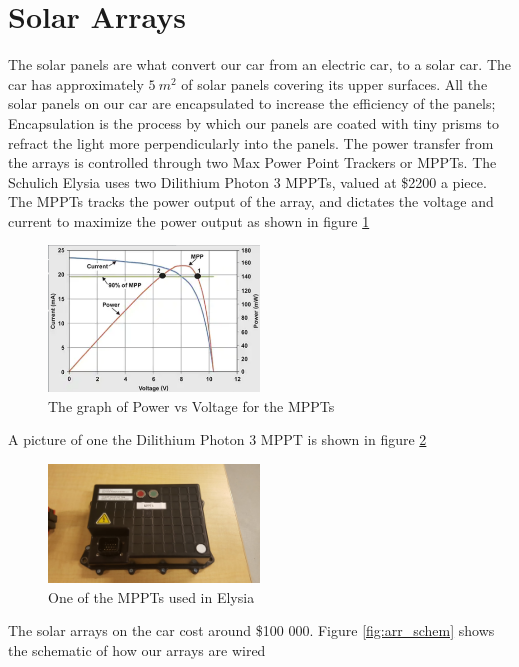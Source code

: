 \documentclass[titlepage]{article}
\begin{document}
    \section{Solar Arrays}
    The solar panels are what convert our car from an electric car, to a
    solar car. The car has approximately $5\ m^2$ of solar panels
    covering its upper surfaces. All the solar panels on our car are
    encapsulated to increase the efficiency of the panels; Encapsulation
    is the process by which our panels are coated with tiny prisms to
    refract the light more perpendicularly into the panels. The power
    transfer from the arrays is controlled through two Max Power Point
    Trackers or MPPTs. The Schulich Elysia uses two Dilithium Photon 3
    MPPTs, valued at \$2200 a piece. The MPPTs tracks the power output
    of the array, and dictates the voltage and current to maximize the
    power output as shown in figure \ref{fig:mppt-graph}
    \begin{figure}[H]
        \centering
        \includegraphics[width=0.5\textwidth]{images/MPPT_Diagram.png}
        \caption{The graph of Power vs Voltage for the MPPTs}
        \label{fig:mppt-graph}
    \end{figure}
    A picture of one the Dilithium Photon 3 MPPT is shown in figure
    \ref{fig:mppt}
    \begin{figure}[H]
        \centering
        \includegraphics[width=0.5\textwidth]{images/mppt.jpg}
        \caption{One of the MPPTs used in Elysia}
        \label{fig:mppt}
    \end{figure}
    The solar arrays on the car cost around \$100 000. Figure
    \ref{fig:arr_schem} shows the schematic of how our arrays are wired
\end{document}
